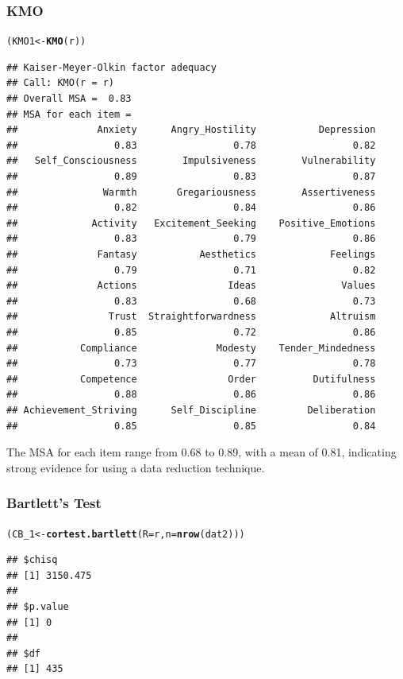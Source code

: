 \documentclass{article}\usepackage[]{graphicx}\usepackage[]{color}
\makeatletter
\newcommand{\hlstd}[1]{\textcolor[rgb]{0.345,0.345,0.345}{#1}}%
\newcommand{\hlkwb}[1]{\textcolor[rgb]{0.69,0.353,0.396}{#1}}%
\newcommand{\hlkwc}[1]{\textcolor[rgb]{0.333,0.667,0.333}{#1}}%
\newcommand{\hlkwd}[1]{\textcolor[rgb]{0.737,0.353,0.396}{\textbf{#1}}}%
\newenvironment{kframe}{%
 \def\at@end@of@kframe{}%
 \ifinner\ifhmode%
  \def\at@end@of@kframe{\end{minipage}}%
  \begin{minipage}{\columnwidth}%
 \fi\fi%
 \def\FrameCommand##1{\hskip\@totalleftmargin \hskip-\fboxsep
 \colorbox{shadecolor}{##1}\hskip-\fboxsep
     \hskip-\linewidth \hskip-\@totalleftmargin \hskip\columnwidth}%
 \MakeFramed {\advance\hsize-\width
   \@totalleftmargin\z@ \linewidth\hsize
   \@setminipage}}%
 {\par\unskip\endMakeFramed%
 \at@end@of@kframe}
\newenvironment{knitrout}{}{} %
\makeatother
\begin{document}
\subsubsection{KMO}
\begin{knitrout}
\color{fgcolor}\begin{kframe}
\begin{alltt}
\hlstd{(KMO1} \hlkwb{<-} \hlkwd{KMO}\hlstd{(r))}
\end{alltt}
\begin{verbatim}
## Kaiser-Meyer-Olkin factor adequacy
## Call: KMO(r = r)
## Overall MSA =  0.83
## MSA for each item = 
##              Anxiety      Angry_Hostility           Depression 
##                 0.83                 0.78                 0.82 
##   Self_Consciousness        Impulsiveness        Vulnerability 
##                 0.89                 0.83                 0.87 
##               Warmth       Gregariousness        Assertiveness 
##                 0.82                 0.84                 0.86 
##             Activity   Excitement_Seeking    Positive_Emotions 
##                 0.83                 0.79                 0.86 
##              Fantasy           Aesthetics             Feelings 
##                 0.79                 0.71                 0.82 
##              Actions                Ideas               Values 
##                 0.83                 0.68                 0.73 
##                Trust  Straightforwardness             Altruism 
##                 0.85                 0.72                 0.86 
##           Compliance              Modesty    Tender_Mindedness 
##                 0.73                 0.77                 0.78 
##           Competence                Order          Dutifulness 
##                 0.88                 0.86                 0.86 
## Achievement_Striving      Self_Discipline         Deliberation 
##                 0.85                 0.85                 0.84
\end{verbatim}
\end{kframe}
\end{knitrout}

The MSA for each item range from 0.68 to 0.89, with a mean of 0.81, indicating strong evidence for using a data reduction technique. 

\subsubsection{Bartlett's Test}
\begin{knitrout}
\color{fgcolor}\begin{kframe}
\begin{alltt}
\hlstd{(CB_1} \hlkwb{<-} \hlkwd{cortest.bartlett}\hlstd{(}\hlkwc{R}\hlstd{=r,}\hlkwc{n}\hlstd{=}\hlkwd{nrow}\hlstd{(dat2)))}
\end{alltt}
\begin{verbatim}
## $chisq
## [1] 3150.475
## 
## $p.value
## [1] 0
## 
## $df
## [1] 435
\end{verbatim}
\end{kframe}
\end{knitrout}
\end{document}

